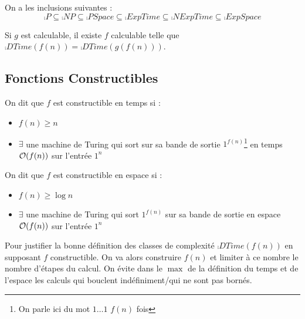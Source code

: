 \documentclass{cours}
\begin{document}
\begin{proposition}
    On a les inclusions suivantes : 
    \[
        \comp{P} \subseteq \comp{NP} \subseteq \comp{PSpace} \subseteq \comp{ExpTime} \subseteq \comp{NExpTime} \subseteq \comp{ExpSpace}
    \]
\end{proposition}

\begin{proposition}
    Si $g$ est calculable, il existe $f$ calculable telle que $\comp{DTime}(f(n)) = \comp{DTime}(g(f(n)))$.
\end{proposition}

\subsection{Fonctions Constructibles}
\begin{definition}
    On dit que $f$ est constructible en temps si : 
    \begin{itemize}
        \item $f(n) \geq n$
        \item $\exists$ une machine de Turing qui sort sur sa bande de sortie $1^{f(n)}$\footnote{On parle ici du mot $1\ldots 1$ $f(n)$ fois} en temps $\mathcal{O}(f(n))$ sur l'entrée $1^{n}$
    \end{itemize}
    On dit que $f$ est constructible en espace si :
    \begin{itemize}
        \item $f(n) \geq \log n$
        \item $\exists$ une machine de Turing qui sort $1^{f(n)}$ sur sa bande de sortie en espace $\mathcal{O}(f(n))$ sur l'entrée $1^{n}$
    \end{itemize}
\end{definition}

Pour justifier la bonne définition des classes de complexité $\comp{DTime}(f(n))$ en supposant $f$ constructible. On va alors construire $f(n)$ et limiter à ce nombre le nombre d'étapes du calcul. On évite dans le $\max$ de la définition du temps et de l'espace les calculs qui bouclent indéfiniment/qui ne sont pas bornés.
\end{document}
